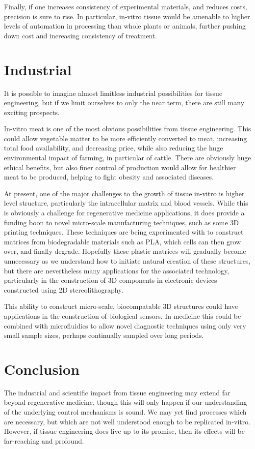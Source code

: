 \documentclass[12pt,a4paper,twocolumn]{article}
\begin{document}
Finally, if one increases consistency of experimental materials, and reduces costs, precision is sure to rise. In particular, in-vitro tissue would be amenable to higher levels of automation in processing than whole plants or animals, further pushing down cost and increasing consistency of treatment.

\section{Industrial}
It is possible to imagine almost limitless industrial possibilities for tissue engineering, but if we limit ourselves to only the near term, there are still many exciting prospects.

In-vitro meat is one of the most obvious possibilities from tissue engineering. This could allow vegetable matter to be more efficiently converted to meat, increasing total food availability, and decreasing price, while also reducing the huge environmental impact of farming, in particular of cattle. There are obviously huge ethical benefits, but also finer control of production would allow for healthier meat to be produced, helping to fight obesity and associated diseases.

At present, one of the major challenges to the growth of tissue in-vitro is higher level structure, particularly the intracellular matrix and blood vessels. While this is obviously a challenge for regenerative medicine applications, it does provide a funding boon to novel micro-scale manufacturing techniques, such as some 3D printing techniques. These techniques are being experimented with to construct matrices from biodegradable materials such as PLA, which cells can then grow over, and finally degrade. Hopefully these plastic matrices will gradually become unnecessary as we understand how to initiate natural creation of these structures, but there are nevertheless many applications for the associated technology, particularly in the construction of 3D components in electronic devices constructed using 2D stereolithography.

This ability to construct micro-scale, biocompatable 3D structures could have applications in the construction of biological sensors. In medicine this could be combined with microfluidics to allow novel diagnostic techniques using only very small sample sizes, perhaps continually sampled over long periods.

\section{Conclusion}
The industrial and scientific impact from tissue engineering may extend far beyond regenerative medicine, though this will only happen if our understanding of the underlying control mechanisms is sound. We may yet find processes which are necessary, but which are not well understood enough to be replicated in-vitro. However, if tissue engineering does live up to its promise, then its effects will be far-reaching and profound.
\end{document}
